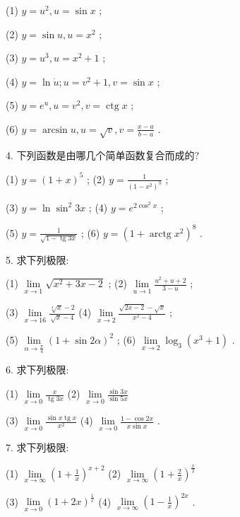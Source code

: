 \documentclass[10pt]{article}
\begin{document}
(1) \(y = {u}^{2},u = \sin x\) ;

(2) \(y = \sin u,u = {x}^{2}\) ;

(3) \(y = {u}^{3},u = {x}^{2} + 1\) ;

(4) \(y = \ln \dot{u};u = {v}^{2} + 1,v = \sin x\) ;

(5) \(y = {e}^{u},u = {v}^{2},v = \operatorname{ctg}x\) ;

(6) \(y = \arcsin u,u = \sqrt{v},v = \frac{x - a}{b - a}\) .

4. 下列函数是由哪几个简单函数复合而成的?

(1) \(y = {\left( 1 + x\right) }^{5}\) ; (2) \(y = \frac{1}{{\left( 1 - {x}^{2}\right) }^{3}}\) ;

(3) \(y = \ln {\sin }^{2}{3x}\) ; (4) \(y = {e}^{2{\cos }^{2}x}\) ;

(5) \(y = \frac{1}{\sqrt{1 - \operatorname{tg}{3x}}}\) ; (6) \(y = {\left( 1 + \operatorname{arctg}{x}^{2}\right) }^{8}\) .

5. 求下列极限:

(1) \(\mathop{\lim }\limits_{{x \rightarrow 1}}\sqrt{{x}^{2} + {3x} - 2}\) ; (2) \(\mathop{\lim }\limits_{{u \rightarrow 1}}\frac{{u}^{2} + u + 2}{3 - u}\) ;

(3) \(\mathop{\lim }\limits_{{x \rightarrow {16}}}\frac{\sqrt[4]{x} - 2}{\sqrt{x} - 4}\) (4) \(\mathop{\lim }\limits_{{x \rightarrow 2}}\frac{\sqrt{{2x} - 2} - \sqrt{x}}{{x}^{2} - 4}\) ;

(5) \(\mathop{\lim }\limits_{{\alpha \rightarrow \frac{\pi }{4}}}{\left( 1 + \sin 2\alpha \right) }^{2}\) ; (6) \(\mathop{\lim }\limits_{{x \rightarrow 2}}{\log }_{3}\left( {{x}^{3} + 1}\right)\) .

6. 求下列极限:

(1) \(\mathop{\lim }\limits_{{x \rightarrow 0}}\frac{x}{\operatorname{tg}{3x}}\) (2) \(\mathop{\lim }\limits_{{x \rightarrow 0}}\frac{\sin {3x}}{\sin {5x}}\)

(3) \(\mathop{\lim }\limits_{{x \rightarrow 0}}\frac{\sin x\operatorname{tg}x}{{x}^{2}}\) (4) \(\mathop{\lim }\limits_{{x \rightarrow 0}}\frac{1 - \cos {2x}}{x\sin x}\) .

7. 求下列极限:

(1) \(\mathop{\lim }\limits_{{x \rightarrow \infty }}{\left( 1 + \frac{1}{x}\right) }^{x + 2}\) (2) \(\mathop{\lim }\limits_{{x \rightarrow \infty }}{\left( 1 + \frac{2}{x}\right) }^{\frac{x}{2}}\)

(3) \(\mathop{\lim }\limits_{{x \rightarrow 0}}{\left( 1 + 2x\right) }^{\frac{1}{x}}\) (4) \(\mathop{\lim }\limits_{{x \rightarrow \infty }}{\left( 1 - \frac{1}{x}\right) }^{2x}\) .
\end{document}
